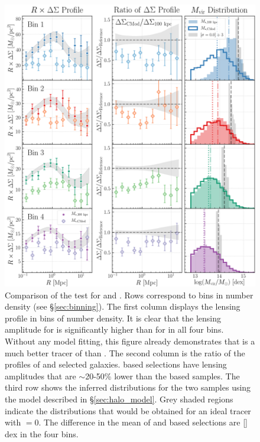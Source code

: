 \documentclass[a4paper,fleqn,usenatbib]{mnras}
\begin{document}
  \begin{figure}
      \centering
      \includegraphics[width=15cm]{figure/topn_dsigma_m100_cmod_compare}
      \caption{
          Comparison of the \topn{} test for  and \mcmodel{}. 
          Rows correspond to bins in number density (see \S \ref{sec:binning}).
          The first column displays the lensing profile \dsigma{} in bins of number density. It
          is clear that the lensing amplitude for  is significantly higher than for
          \mcmodel{} in all four bins.
          Without any model fitting, this figure already demonstrates that  is a much
          better tracer of \mvir{} than \mcmodel{}.
          The second column is the ratio of the \dsigma{} profiles of \mcmodel{} and 
          selected galaxies. 
          \mcmodel{} based selections
          have lensing amplitudes that are $\sim$20-50\% lower than the  based samples. 
          The
          third row shows the inferred \mvir{} distributions for the two samples using the
          model described in \S \ref{sec:halo_model}. 
          Grey shaded regions indicate the distributions that would be
          obtained for an ideal tracer with \sigmh{}$=0$. 
          The difference in the mean \mvir{} of
          \mcmodel{} and \maper{} based selections are [\todo{}] dex in the four bins.
          }
      \label{fig:m100_cmod}
  \end{figure}
\end{document}
